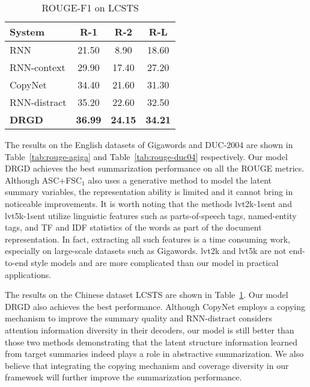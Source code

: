 \documentclass[11pt,letterpaper]{article}
\begin{document}
\begin{table}[!t]
	\centering
	\caption{ROUGE-F1 on LCSTS}
	\label{tab:rouge-lcsts}
	\begin{tabular}{p{2.6cm} c c c}
		\hline
		\textbf{System}  & \textbf{R-1} & \textbf{R-2} & \textbf{R-L} \\
		\hline
		RNN       & 21.50 & 8.90 & 18.60  \\
		RNN-context       & 29.90 & 17.40 & 27.20  \\
		CopyNet       & 34.40 & 21.60 & 31.30  \\
		RNN-distract & 35.20 & 22.60 & 32.50  \\
		\textbf{DRGD}       & \textbf{36.99} & \textbf{24.15} & \textbf{34.21} \\
		\hline
	\end{tabular}
\end{table}

The results on the English datasets of Gigawords and DUC-2004 are shown in Table~\ref{tab:rouge-agiga} and Table~\ref{tab:rouge-duc04} respectively.
Our model DRGD achieves the best summarization performance on all the ROUGE metrics.
Although ASC+FSC$_1$ also uses a generative method to model the latent summary variables, the representation ability is limited and it cannot bring in noticeable improvements. 
It is worth noting that the methods lvt2k-1sent and lvt5k-1sent \cite{nallapati2016abstractive} utilize linguistic features such as parts-of-speech tags, named-entity tags, and TF and IDF statistics of the words as part of the document representation.
In fact, extracting all such features is a time consuming work, especially on  large-scale datasets such as Gigawords.  lvt2k and lvt5k are not end-to-end style models and are more complicated than our model in practical applications.

The results on the Chinese dataset LCSTS are shown in Table~\ref{tab:rouge-lcsts}.
Our model DRGD also achieves the best performance. Although CopyNet employs a copying mechanism to improve the summary quality and RNN-distract considers attention information diversity in their decoders, our model is still better than those two methods demonstrating that the latent structure information learned from target summaries indeed plays a role in abstractive summarization.
We also believe that integrating the copying mechanism and coverage diversity in our framework will further improve the summarization performance. 
\end{document}
